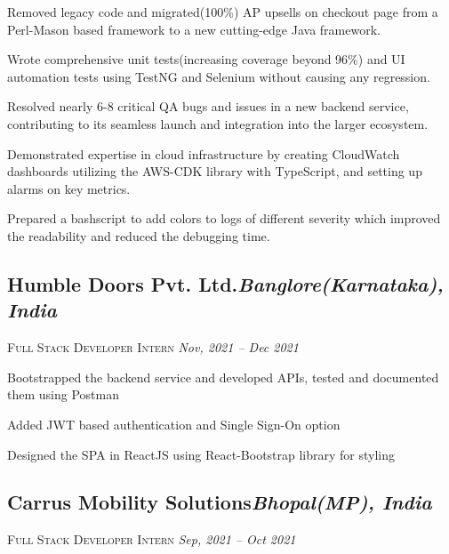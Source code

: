 \documentclass[10pt]{article}
\begin{document}
\begin{description}
\setlength{\itemindent}{2\parindent}
\setlength{\itemsep}{0em}
\item[$\bullet$]{Removed legacy code and migrated(100\%) AP upsells on checkout page from a Perl-Mason based framework to a new cutting-edge Java framework.
\item[$\bullet$] Wrote comprehensive unit tests(increasing coverage beyond 96\%) and UI automation tests using TestNG and Selenium without causing any regression.}
\item[$\bullet$]{Resolved nearly 6-8 critical QA bugs and issues in a new backend service, contributing to its seamless launch and integration into the larger ecosystem.}
\item[$\bullet$]{Demonstrated expertise in cloud infrastructure by creating CloudWatch dashboards utilizing the AWS-CDK library with TypeScript, and setting up alarms on key metrics.}
\item[$\bullet$] Prepared a bashscript to add colors to logs of different severity which improved the readability and reduced the debugging time.
\end{description}

\subsection*{Humble Doors Pvt. Ltd.\hfill \normalsize \normalfont \textit{Banglore(Karnataka), India}}
\vspace{-1ex}
\textsc{\textmd{Full Stack Developer Intern}} \hfill \normalsize \textit{Nov, 2021 -- Dec 2021}
\vspace{-1ex}

\begin{description}
\setlength{\itemindent}{2\parindent}
\setlength{\itemsep}{0em}
\item[$\bullet$]{Bootstrapped the backend service and developed APIs, tested and documented them using Postman}
\item[$\bullet$]{Added JWT based authentication and Single Sign-On option}
\item[$\bullet$]{Designed the SPA in ReactJS using React-Bootstrap library for styling}
\end{description}

\subsection*{Carrus Mobility Solutions\hfill \normalsize \normalfont \textit{Bhopal(MP), India}}
\vspace{-1ex}
\textsc{\textmd{Full Stack Developer Intern}} \hfill \normalsize \textit{Sep, 2021 -- Oct 2021}
\vspace{-1ex}
\end{document}
